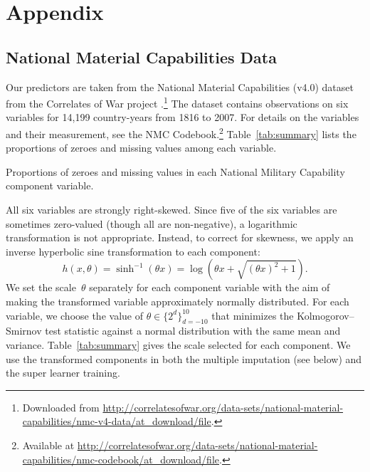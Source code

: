 
\section{Appendix}

\subsection{National Material Capabilities Data}

Our predictors are taken from the National Material Capabilities (v4.0) dataset from the Correlates of War project .\footnote{
  Downloaded from \url{http://correlatesofwar.org/data-sets/national-material-capabilities/nmc-v4-data/at_download/file}.
}
The dataset contains observations on six variables for 14,199 country-years from 1816 to 2007.
For details on the variables and their measurement, see the NMC Codebook.\footnote{
  Available at \url{http://correlatesofwar.org/data-sets/national-material-capabilities/nmc-codebook/at_download/file}.
}
Table~\ref{tab:summary} lists the proportions of zeroes and missing values among each variable.

\begin{table}[htp]
  \centering
  
  \caption{
    Proportions of zeroes and missing values in each National Military Capability component variable.
  }
  \label{tab:summary}
\end{table}

All six variables are strongly right-skewed.
Since five of the six variables are sometimes zero-valued (though all are non-negative), a logarithmic transformation is not appropriate.
Instead, to correct for skewness, we apply an inverse hyperbolic sine transformation  to each component:
\begin{equation}
  \label{eq:asinh}
  h(x, \theta)
  =
  \sinh^{-1} (\theta x)
  =
  \log \left(
    \theta x + \sqrt{(\theta x)^2 + 1}
  \right).
\end{equation}
We set the scale~$\theta$ separately for each component variable with the aim of making the transformed variable approximately normally distributed.
For each variable, we choose the value of $\theta \in \{2^d\}_{d=-10}^{10}$ that minimizes the Kolmogorov--Smirnov test statistic  against a normal distribution with the same mean and variance.
Table~\ref{tab:summary} gives the scale selected for each component.
We use the transformed components in both the multiple imputation (see below) and the super learner training.

